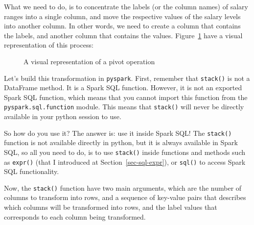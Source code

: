 \documentclass[
  11pt,
  letterpaper,
  DIV=11,
  numbers=noendperiod]{scrreprt}
\begin{document}
What we need to do, is to concentrate the labels (or the column names)
of salary ranges into a single column, and move the respective values of
the salary levels into another column. In other words, we need to create
a column that contains the labels, and another column that contains the
values. Figure~\ref{fig-pivot1} have a visual representation of this
process:

\begin{figure}


\caption{\label{fig-pivot1}A visual representation of a pivot operation}

\end{figure}%

Let's build this transformation in \texttt{pyspark}. First, remember
that \texttt{stack()} is not a DataFrame method. It is a Spark SQL
function. However, it is not an exported Spark SQL function, which means
that you cannot import this function from the
\texttt{pyspark.sql.function} module. This means that \texttt{stack()}
will never be directly available in your python session to use.

So how do you use it? The answer is: use it inside Spark SQL! The
\texttt{stack()} function is not available directly in python, but it is
always available in Spark SQL, so all you need to do, is to use
\texttt{stack()} inside functions and methods such as \texttt{expr()}
(that I introduced at Section~\ref{sec-sql-expr}), or \texttt{sql()} to
access Spark SQL functionality.

Now, the \texttt{stack()} function have two main arguments, which are
the number of columns to transform into rows, and a sequence of
key-value pairs that describes which columns will be transformed into
rows, and the label values that corresponds to each column being
transformed.
\end{document}
